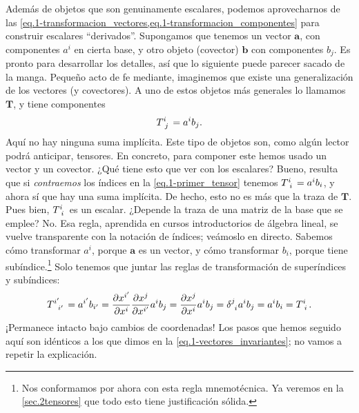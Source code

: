 Además de objetos que son genuinamente escalares, podemos aprovecharnos de las \cref{eq.1-transformacion_vectores,eq.1-transformacion_componentes} para construir escalares ``derivados''. Supongamos que tenemos un vector \(\mathbf{a}\), con componentes \(a^i\) en cierta base, y otro objeto (covector) \(\mathbf{b}\) con componentes \(b_j\). Es pronto para desarrollar los detalles, así que lo siguiente puede parecer sacado de la manga. Pequeño acto de fe mediante, imaginemos que existe una generalización de los vectores (y covectores). A uno de estos objetos más generales lo llamamos \(\mathbf{T}\), y tiene componentes
\begin{equation}
    \label{eq.1-primer_tensor}
    \tensor{T}{^i_j} = a^i b_j.
\end{equation}
Aquí no hay ninguna suma implícita. Este tipo de objetos son, como algún lector podrá anticipar, tensores. En concreto, para componer este hemos usado un vector y un covector. ¿Qué tiene esto que ver con los escalares? Bueno, resulta que si \emph{contraemos} los índices en la \cref{eq.1-primer_tensor} tenemos \(\tensor{T}{^i_i} = a^i b_i\), y ahora sí que hay una suma implícita. De hecho, esto no es más que la traza de \(\mathbf{T}\). Pues bien, \(\tensor{T}{^i_i}\) es un escalar. ¿Depende la traza de una matriz de la base que se emplee? No. Esa regla, aprendida en cursos introductorios de álgebra lineal, se vuelve transparente con la notación de índices; veámoslo en directo. Sabemos cómo transformar \(a^i\), porque \(\mathbf{a}\) es un vector, y cómo transformar \(b_i\), porque tiene subíndice.\footnote{Nos conformamos por ahora con esta regla mnemotécnica. Ya veremos en la \cref{sec.2tensores} que todo esto tiene justificación sólida.} Solo tenemos que juntar las reglas de transformación de superíndices y subíndices:
\begin{equation}
    \tensor{T}{^{i'}_{i'}} = a^{i'} b_{i'} = \jcbn{x}{i'}{x}{i}  \jcbn{x}{j}{x}{i'} a^i b_j =  \jcbn{x}{j}{x}{i} a^i b_j = \tensor{\delta}{^j_i} a^i b_j = a^ib_i = \tensor{T}{^{i}_{i}}.
\end{equation}
¡Permanece intacto bajo cambios de coordenadas! Los pasos que hemos seguido aquí son idénticos a los que dimos en la \cref{eq.1-vectores_invariantes}; no vamos a repetir la explicación. 

